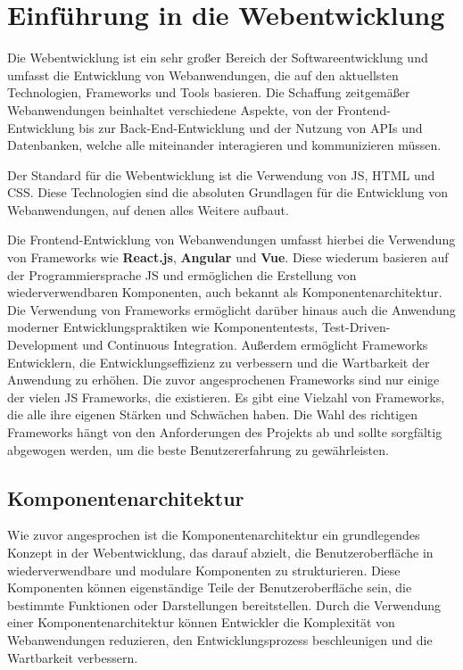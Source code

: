 \section{Einführung in die Webentwicklung}

Die Webentwicklung ist ein sehr großer Bereich der Softwareentwicklung und umfasst die Entwicklung von Webanwendungen, die auf den aktuellsten Technologien, Frameworks und Tools basieren. Die Schaffung zeitgemäßer Webanwendungen beinhaltet verschiedene Aspekte, von der Frontend-Entwicklung bis zur Back-End-Entwicklung und der Nutzung von \acf{API}s und Datenbanken, welche alle miteinander interagieren und kommunizieren müssen.

Der Standard für die Webentwicklung ist die Verwendung von \acf{JS}, \acf{HTML} und \acf{CSS}. Diese Technologien sind die absoluten Grundlagen für die Entwicklung von Webanwendungen, auf denen alles Weitere aufbaut.

Die Frontend-Entwicklung von Webanwendungen umfasst hierbei die Verwendung von Frameworks wie \textbf{React.js}, \textbf{Angular} und \textbf{Vue}. Diese wiederum basieren auf der Programmiersprache \acl{JS} und ermöglichen die Erstellung von wiederverwendbaren Komponenten, auch bekannt als Komponentenarchitektur. Die Verwendung von Frameworks ermöglicht darüber hinaus auch die Anwendung moderner Entwicklungspraktiken wie Komponententests, Test-Driven-Development und Continuous Integration. Außerdem ermöglicht Frameworks Entwicklern, die Entwicklungseffizienz zu verbessern und die Wartbarkeit der Anwendung zu erhöhen. Die zuvor angesprochenen Frameworks sind nur einige der vielen \acl{JS} Frameworks, die existieren. Es gibt eine Vielzahl von Frameworks, die alle ihre eigenen Stärken und Schwächen haben. Die Wahl des richtigen Frameworks hängt von den Anforderungen des Projekts ab und sollte sorgfältig abgewogen werden, um die beste Benutzererfahrung zu gewährleisten.\cite{modern-webdevelopment:1, modern-webdevelopment:2}

\subsection{Komponentenarchitektur}

Wie zuvor angesprochen ist die Komponentenarchitektur ein grundlegendes Konzept in der Webentwicklung, das darauf abzielt, die Benutzeroberfläche in wiederverwendbare und modulare Komponenten zu strukturieren. Diese Komponenten können eigenständige Teile der Benutzeroberfläche sein, die bestimmte Funktionen oder Darstellungen bereitstellen. Durch die Verwendung einer Komponentenarchitektur können Entwickler die Komplexität von Webanwendungen reduzieren, den Entwicklungsprozess beschleunigen und die Wartbarkeit verbessern.

